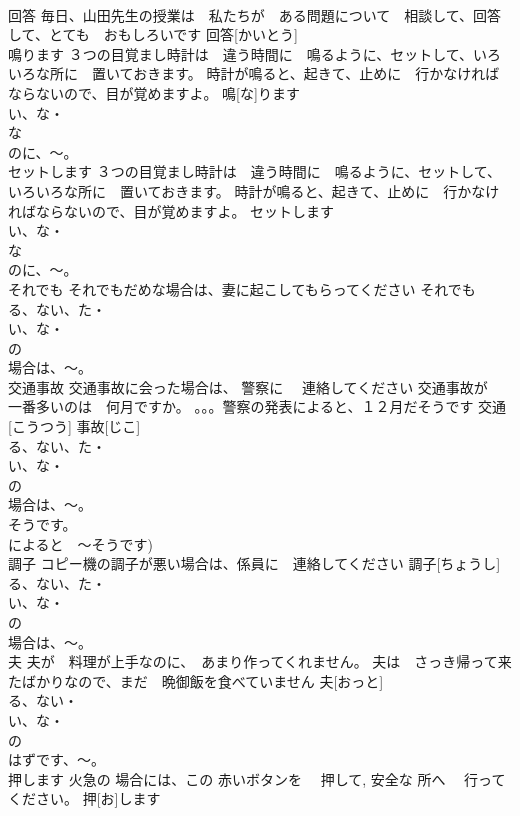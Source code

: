 \documentclass[8pt]{extreport}
\begin{document}
\begin{CJK}{UTF8}{min}
\\	回答	毎日、山田先生の授業は　私たちが　ある問題について　相談して、回答して、とても　おもしろいです	回答[かいとう]					
\\	鳴ります	３つの目覚まし時計は　違う時間に　鳴るように、セットして、いろいろな所に　置いておきます。 時計が鳴ると、起きて、止めに　行かなければならないので、目が覚めますよ。	鳴[な]ります				
\\	い、な・
\\	な
\\	のに、～。
\\	セットします	３つの目覚まし時計は　違う時間に　鳴るように、セットして、いろいろな所に　置いておきます。 時計が鳴ると、起きて、止めに　行かなければならないので、目が覚めますよ。	セットします				
\\	い、な・
\\	な
\\	のに、～。
\\	それでも	それでもだめな場合は、妻に起こしてもらってください	それでも			
\\	る、ない、た・
\\	い、な・
\\	の
\\	場合は、～。
\\	交通事故	交通事故に会った場合は、 警察に　 連絡してください 交通事故が　一番多いのは　何月ですか。 。。。警察の発表によると、１２月だそうです	交通[こうつう] 事故[じこ]				
\\	る、ない、た・
\\	い、な・
\\	の
\\	場合は、～。
\\	そうです。
\\	によると　～そうです)	
\\	調子	コピー機の調子が悪い場合は、係員に　連絡してください	調子[ちょうし]				
\\	る、ない、た・
\\	い、な・
\\	の
\\	場合は、～。
\\	夫	夫が　料理が上手なのに、　あまり作ってくれません。 夫は　さっき帰って来たばかりなので、まだ　晩御飯を食べていません	夫[おっと]				
\\	る、ない・
\\	い、な・
\\	の
\\	はずです、～。
\\	押します	火急の 場合には、この 赤いボタンを　 押して, 安全な 所へ　 行ってください。	押[お]します					

\end{CJK}
\end{document}
